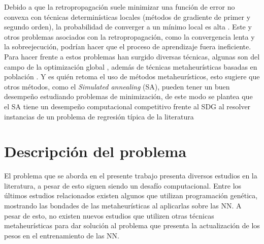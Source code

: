 Debido a que la retropropagación suele minimizar una función de error no convexa con técnicas determinísticas locales (métodos de gradiente de primer y segundo orden), la probabilidad de converger a un mínimo local es alta \cite{Bianchini1996, Bishop1995, Battiti1995}. Este y otros problemas asociados con la retropropagación, como la convergencia lenta y la sobreejecución, podrían hacer que el proceso de aprendizaje fuera ineficiente. Para hacer frente a estos problemas han surgido diversas técnicas, algunas son del campo de la optimización global \cite{Battiti1995, Tsai2006, Rocha2003, Chelouah2000, Zheng2005}, además de técnicas metaheurísticas basadas en población \cite{Lamos2012}. Y es  quién retoma el uso de métodos metaheurísticos, esto sugiere que otros métodos, como el {\em Simulated annealing} (SA), pueden tener un buen desempeño estudiando problemas de minimización, de este modo se plantea que el SA tiene un desempeño computacional competitivo frente al SDG al resolver instancias de un problema de regresión típica de la literatura

















\section{Descripción del problema}
El problema que se aborda en el presente trabajo presenta diversos estudios en la literatura, a pesar de esto siguen siendo un desafío computacional. Entre los últimos estudios relacionados existen algunos que utilizan programación genética, mostrando las bondades de las metaheurísticas al aplicarlas sobre las NN. A pesar de esto, no existen nuevos estudios que utilizen otras técnicas metaheurísticas para dar solución al problema que presenta la actualización de los pesos en el entrenamiento de las NN.

